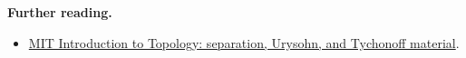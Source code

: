 \documentclass[preprint,12pt,aps,pra,showkeys,amsmath,amssymb,superscriptaddress,floatfix]{revtex4-2}
\theoremstyle{definition}
\theoremstyle{remark}
\providecommand{\tightlist}{\setlength{\itemsep}{2pt}\setlength{\parskip}{0pt}}
\begin{document}
\par\smallskip\begingroup\small\linespread{1.0}\selectfont\noindent\textbf{Further reading.} \begin{itemize}
\tightlist
\item
  \href{https://ocw.mit.edu/courses/18-901-introduction-to-topology-fall-2004/pages/lecture-notes/}{MIT
  Introduction to Topology: separation, Urysohn, and Tychonoff
  material}.
\end{itemize}\par\endgroup
\end{document}
